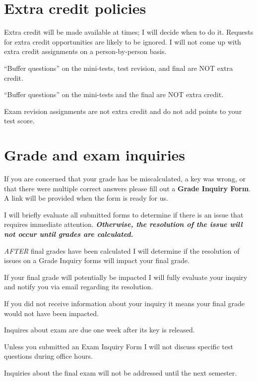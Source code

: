 \documentclass[
]{book}
\begin{document}
\hypertarget{extracredit}{%
\chapter{Extra credit policies}\label{extracredit}}

Extra credit will be made available at times; I will decide when to do it. Requests for extra credit opportunities are likely to be ignored. I will not come up with extra credit assignments on a person-by-person basis.

``Buffer questions'' on the mini-tests, test revision, and final are NOT extra credit.

``Buffer questions'' on the mini-tests and the final are NOT extra credit.

Exam revision assignments are not extra credit and do not add points to your test score.

\hypertarget{grade-and-exam-inquiries}{%
\chapter{Grade and exam inquiries}\label{grade-and-exam-inquiries}}

If you are concerned that your grade has be miscalculated, a key was wrong, or that there were multiple correct answers please fill out a \textbf{Grade Inquiry Form}. A link will be provided when the form is ready for us.

I will briefly evaluate all submitted forms to determine if there is an issue that requires immediate attention. \textbf{\emph{Otherwise, the resolution of the issue will not occur until grades are calculated.}}

\emph{AFTER} final grades have been calculated I will determine if the resolution of issues on a Grade Inquiry forms will impact your final grade.

If your final grade will potentially be impacted I will fully evaluate your inquiry and notify you via email regarding its resolution.

If you did not receive information about your inquiry it means your final grade would not have been impacted.

Inquires about exam are due one week after its key is released.

Unless you submitted an Exam Inquiry Form I will not discuss specific test questions during office hours.

Inquiries about the final exam will not be addressed until the next semester.
\end{document}
